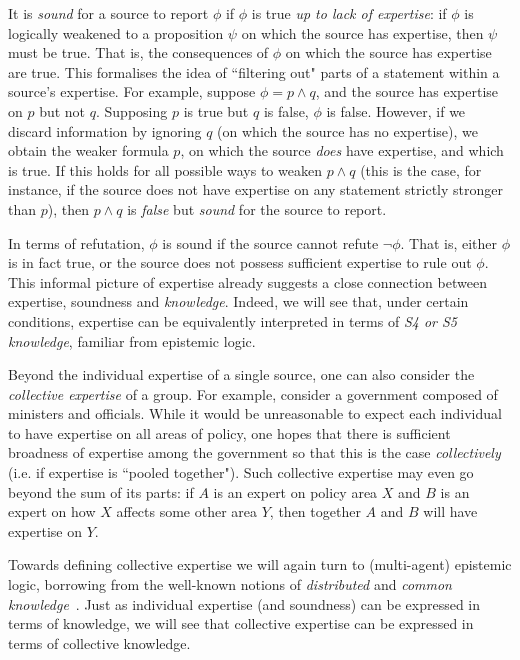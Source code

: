 It is \emph{sound} for a source to report $\phi$ if $\phi$ is true \emph{up to
lack of expertise}: if $\phi$ is logically weakened to a proposition $\psi$ on
which the source has expertise, then $\psi$ must be true. That is, the
consequences of $\phi$ on which the source has expertise are true.
%
This formalises the idea of ``filtering out" parts of a statement within a
source's expertise. For example, suppose $\phi = p \land q$, and the source has
expertise on $p$ but not $q$. Supposing $p$ is true but $q$ is false, $\phi$ is
false. However, if we discard information by ignoring $q$ (on which the source
has no expertise), we obtain the weaker formula $p$, on which the source
\emph{does} have expertise, and which is true. If this holds for all possible
ways to weaken $p \land q$ (this is the case, for instance, if the source does
not have expertise on any statement strictly stronger than $p$), then $p \land
q$ is \emph{false} but \emph{sound} for the source to report.

In terms of refutation, $\phi$ is sound if the source cannot refute $\neg\phi$.
That is, either $\phi$ is in fact true, or the source does not possess
sufficient expertise to rule out $\phi$.
%
This informal picture of expertise already suggests a close connection between
expertise, soundness and \emph{knowledge}. Indeed, we will see that, under
certain conditions, expertise can be equivalently interpreted in terms of
\emph{S4 or S5 knowledge}, familiar from epistemic logic.

Beyond the individual expertise of a single source, one can also consider the
\emph{collective expertise} of a group. For example, consider a government
composed of ministers and officials. While it would be unreasonable to expect
each individual to have expertise on all areas of policy, one hopes that there
is sufficient broadness of expertise among the government so that this is the
case \emph{collectively} (i.e. if expertise is ``pooled together"). Such
collective expertise may even go beyond the sum of its parts: if $A$ is an
expert on policy area $X$ and $B$ is an expert on how $X$ affects some other
area $Y$, then together $A$ and $B$ will have expertise on $Y$. 

Towards defining collective expertise we will again turn to (multi-agent)
epistemic logic, borrowing from the well-known notions of \emph{distributed}
and \emph{common knowledge}~\citep{fagin2003reasoning}. Just as individual
expertise (and soundness) can be expressed in terms of knowledge, we will see
that collective expertise can be expressed in terms of collective knowledge.

